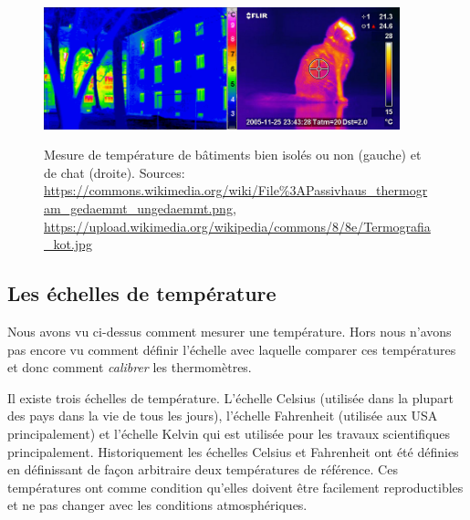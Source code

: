 \documentclass[a4paper,12pt]{book}
\begin{document}
\begin{figure}
\begin{center}
\includegraphics[width=0.5\textwidth]{figs/mais_infra.png}\quad \includegraphics[width=0.42\textwidth]{figs/Termografia_cat.jpg}
\caption{Mesure de température de bâtiments bien isolés ou non (gauche) et de chat (droite). Sources: \url{https://commons.wikimedia.org/wiki/File\%3APassivhaus_thermogram_gedaemmt_ungedaemmt.png}, \url{https://upload.wikimedia.org/wikipedia/commons/8/8e/Termografia_kot.jpg}}
\label{fig_thermographie}
\end{center}
\end{figure}  

\subsection{Les échelles de température}

Nous avons vu ci-dessus comment mesurer une température. Hors nous n'avons pas encore vu comment définir l'échelle 
avec laquelle comparer ces températures et donc comment \textit{calibrer} les thermomètres. 

Il existe trois échelles de température. L'échelle Celsius (utilisée dans la plupart des pays dans la vie de tous les jours), 
l'échelle Fahrenheit (utilisée aux USA principalement) et l'échelle Kelvin qui est utilisée pour les travaux scientifiques
principalement. Historiquement les échelles Celsius et Fahrenheit ont été définies en définissant
de façon arbitraire deux températures de référence. Ces températures ont comme condition qu'elles doivent être facilement reproductibles
et ne pas changer avec les conditions atmosphériques. 
\end{document}
